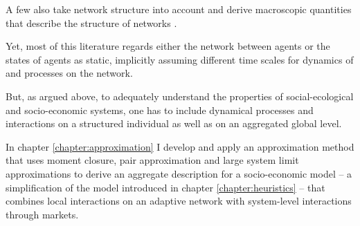 A few also take network structure into account and derive macroscopic quantities that describe the structure of networks \citep[e.g.][]{Alfarano2008a, Lux2016}.

Yet, most of this literature regards either the network between agents or the states of agents as static, implicitly assuming different time scales for dynamics of and processes on the network.

But, as argued above, to adequately understand the properties of social-ecological and socio-economic systems, one has to include dynamical processes and interactions on a structured individual as well as on an aggregated global level.

In chapter \ref{chapter:approximation} I develop and apply an approximation method that uses moment closure, pair approximation and large system limit approximations to derive an aggregate description for a socio-economic model -- a simplification of the model introduced in chapter \ref{chapter:heuristics} -- that combines local interactions on an adaptive network with system-level interactions through markets. 

